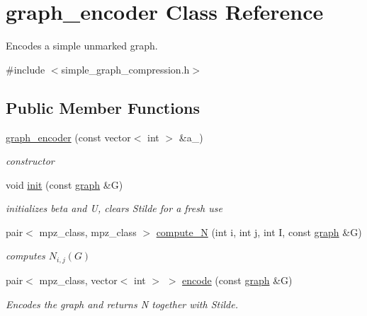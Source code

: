 \hypertarget{classgraph__encoder}{}\section{graph\+\_\+encoder Class Reference}
\label{classgraph__encoder}


Encodes a simple unmarked graph.  




{\ttfamily \#include $<$simple\+\_\+graph\+\_\+compression.\+h$>$}

\subsection*{Public Member Functions}
\begin{DoxyCompactItemize}
\item 
\hyperlink{classgraph__encoder_a571aefbf0b6ad203346fc4e0ef1a33dc}{graph\+\_\+encoder} (const vector$<$ int $>$ \&a\+\_\+)
\begin{DoxyCompactList}\small\item\em constructor \end{DoxyCompactList}\item 
void \hyperlink{classgraph__encoder_a6cfb6fca4bc50d4e5d267060a91f43c3}{init} (const \hyperlink{classgraph}{graph} \&G)
\begin{DoxyCompactList}\small\item\em initializes beta and U, clears Stilde for a fresh use \end{DoxyCompactList}\item 
pair$<$ mpz\+\_\+class, mpz\+\_\+class $>$ \hyperlink{classgraph__encoder_ae7273c47d6dab8367daa5ee6a9cdbc72}{compute\+\_\+N} (int i, int j, int I, const \hyperlink{classgraph}{graph} \&G)
\begin{DoxyCompactList}\small\item\em computes $N_{i,j}(G)$ \end{DoxyCompactList}\item 
pair$<$ mpz\+\_\+class, vector$<$ int $>$ $>$ \hyperlink{classgraph__encoder_a23350e4c0986763b24d14c5ef1beb37e}{encode} (const \hyperlink{classgraph}{graph} \&G)
\begin{DoxyCompactList}\small\item\em Encodes the graph and returns N together with Stilde. \end{DoxyCompactList}\end{DoxyCompactItemize}
